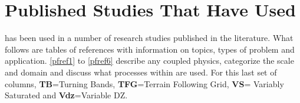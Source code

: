 
\section{Published Studies That Have Used \parflow{}}
\label{lit_table}

\parflow{} has been used in a number of research studies published in the literature. 
What follows are tables of \parflow{} references with information on topics, types of problem and
application.  \ref{pfref1} to \ref{pfref6} describe any coupled physics, 
categorize the scale and domain and discuss what processes within \parflow{} are used.  For this last
set of columns, {\bf TB}=Turning Bands, {\bf TFG}=Terrain Following Grid, {\bf VS}= Variably Saturated
and {\bf Vdz}=Variable DZ.\\
\newpage


